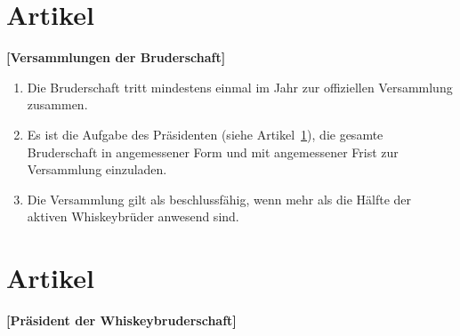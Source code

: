 \documentclass[a4paper,12pt]{scrartcl}
\begin{document}
\section{Artikel \thesection}
\label{sec:versammlungen}
\textbf{[Versammlungen der Bruderschaft]}

\begin{enumerate}

\item Die Bruderschaft tritt mindestens einmal im Jahr zur offiziellen Versammlung zusammen.

\item Es ist die Aufgabe des Präsidenten (siehe Artikel~\ref{sec:versammlungen}), die gesamte
  Bruderschaft in angemessener Form und mit angemessener Frist zur Versammlung einzuladen.

\item Die Versammlung gilt als beschlussfähig, wenn mehr als die Hälfte der aktiven Whiskeybrüder
  anwesend sind.

\end{enumerate}



\section{Artikel \thesection}
\label{sec:präsident}
\textbf{[Präsident der Whiskeybruderschaft]}
\end{document}

